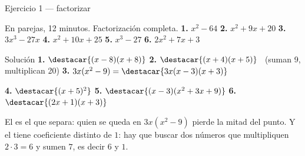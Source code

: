 \documentclass[aspectratio=169,10pt]{beamer}
\begin{document}
\begin{frame}{Ejercicio 1 — factorizar}
  \scriptsize
  \begin{alertblock}{En parejas, 12 minutos. Factorización completa.}
    \tiny
    \textbf{1.} $x^{2}-64$ \qquad
    \textbf{2.} $x^{2}+9x+20$ \qquad
    \textbf{3.} $3x^{3}-27x$ \qquad
    \textbf{4.} $x^{2}+10x+25$ \qquad
    \textbf{5.} $x^{3}-27$ \qquad
    \textbf{6.} $2x^{2}+7x+3$
  \end{alertblock}

  \vspace{0.06cm}
  \begin{block}{Solución}
    \tiny
    \textbf{1.} $\destacar{(x-8)(x+8)}$ \qquad
    \textbf{2.} $\destacar{(x+4)(x+5)}$ \ {\color{uniGris}(suman 9,
    multiplican 20)} \qquad
    \textbf{3.} $3x(x^{2}-9) = \destacar{3x(x-3)(x+3)}$

    \vspace{0.08cm}
    \textbf{4.} $\destacar{(x+5)^{2}}$ \qquad
    \textbf{5.} $\destacar{(x-3)(x^{2}+3x+9)}$ \qquad
    \textbf{6.} $\destacar{(2x+1)(x+3)}$
  \end{block}

  \vspace{0.05cm}
  {\tiny\color{uniGris} El  es el que separa: quien se queda en
  $3x(x^{2}-9)$ pierde la mitad del punto. Y el  tiene
  coeficiente distinto de $1$: hay que buscar dos números que multipliquen
  $2\cdot 3 = 6$ y sumen $7$, es decir $6$ y $1$.}
\end{frame}

\end{document}
